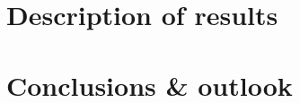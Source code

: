 \documentclass[12pt]{article}
\begin{document}






\section{Description of results}







\section{Conclusions \& outlook}





%










\end{document}
